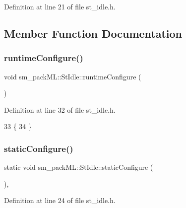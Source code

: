 Definition at line 21 of file st\+\_\+idle.\+h.



\subsection{Member Function Documentation}
\mbox{\label{structsm__packML_1_1StIdle_a4b0427716c4054b1345876384066473e}} 
\subsubsection{\texorpdfstring{runtime\+Configure()}{runtimeConfigure()}}
{\footnotesize\ttfamily void sm\+\_\+pack\+M\+L\+::\+St\+Idle\+::runtime\+Configure (\begin{DoxyParamCaption}{ }\end{DoxyParamCaption})\hspace{0.3cm}{\ttfamily [inline]}}



Definition at line 32 of file st\+\_\+idle.\+h.


\begin{DoxyCode}
33     \{
34     \}
\end{DoxyCode}
\mbox{\label{structsm__packML_1_1StIdle_a946ecb6d3aeee4886ea37640ec630385}} 
\subsubsection{\texorpdfstring{static\+Configure()}{staticConfigure()}}
{\footnotesize\ttfamily static void sm\+\_\+pack\+M\+L\+::\+St\+Idle\+::static\+Configure (\begin{DoxyParamCaption}{ }\end{DoxyParamCaption})\hspace{0.3cm}{\ttfamily [inline]}, {\ttfamily [static]}}



Definition at line 24 of file st\+\_\+idle.\+h.


